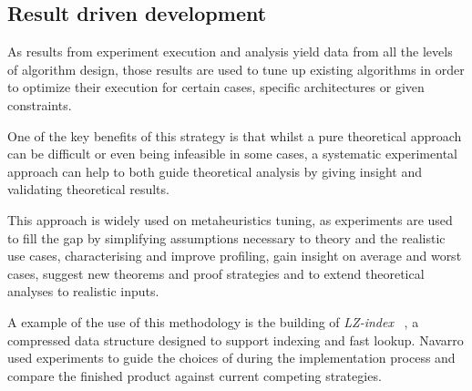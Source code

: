\subsection{Result driven development}
As results from experiment execution and analysis yield data from all the levels of algorithm design, those results are used to tune up existing algorithms in order to optimize their execution for certain cases, specific architectures or given constraints.

One of the key benefits of this strategy is that whilst a pure theoretical approach can be difficult or even being infeasible in some cases, a systematic experimental approach can help to both guide theoretical analysis by giving insight and validating theoretical results.

This approach is widely used on metaheuristics tuning, as experiments are used to fill the gap by simplifying assumptions necessary to theory and the realistic use cases, characterising and improve profiling, gain insight on average and worst cases, suggest new theorems and proof strategies and to extend theoretical analyses to realistic inputs.

A example of the use of this methodology is the building of \textit{LZ-index} ~\cite{Navarro_2009}, a compressed data structure designed to support indexing and fast lookup. Navarro used experiments to guide the choices of during the implementation process and compare the finished product against current competing strategies.
